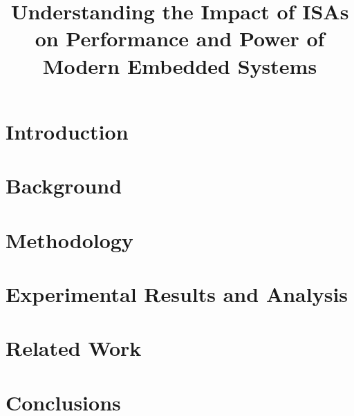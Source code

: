 \documentclass{sig-alternate}
\title{Understanding the Impact of ISAs on Performance and Power of Modern Embedded Systems}
\begin{document}
\maketitle
\thispagestyle{firstpage}
\pagestyle{plain}




\begin{abstract}

  

\end{abstract}

\section{Introduction}


\section{Background}


\section{Methodology}


\section{Experimental Results and Analysis}


\section{Related Work}
%

\section{Conclusions}


\end{document}
